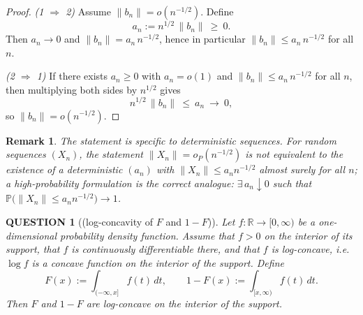 \documentclass[12pt]{article}
\renewcommand{\(}{\left(}%
\renewcommand{\)}{\right)}%
\renewcommand{\[}{\left[}%
\renewcommand{\]}{\right]}%
\newtheorem{question}{QUESTION}[section]}
\newtheorem{remark}{Remark}[section]}
\newtheorem{proof}{Proof.}}
\begin{document}
\begin{proof}
\emph{(1 $\Rightarrow$ 2)} Assume $\|b_n\|=o(n^{-1/2})$. Define
\begin{equation*}
	a_n:=n^{1/2}\,\|b_n\|\ \ge\ 0.
\end{equation*}
Then $a_n\to0$ and $\|b_n\|=a_n\,n^{-1/2}$, hence in particular
$\|b_n\|\le a_n\,n^{-1/2}$ for all $n$.

\smallskip
\noindent
\emph{(2 $\Rightarrow$ 1)} If there exists $a_n\ge0$ with $a_n=o(1)$ and
$\|b_n\|\le a_n\,n^{-1/2}$ for all $n$, then multiplying both sides by $n^{1/2}$
gives
\begin{equation*}
	n^{1/2}\,\|b_n\|\ \le\ a_n\ \longrightarrow\ 0,
\end{equation*}
so $\|b_n\|=o(n^{-1/2})$.
\end{proof}

\begin{remark}
The statement is specific to \emph{deterministic} sequences. For random
sequences $(X_n)$, the statement $\|X_n\|=o_P(n^{-1/2})$ is \emph{not}
equivalent to the existence of a deterministic $(a_n)$ with
$\|X_n\|\le a_n n^{-1/2}$ almost surely for all $n$; a high-probability
formulation is the correct analogue:
$\exists\,a_n\downarrow0$ such that
$\mathbb P\!\big(\|X_n\|\le a_n n^{-1/2}\big)\to1$.
\end{remark}

\begin{question}[(log-concavity of $F$ and $1-F$)]
	Let $f:\mathbb{R}\to[0,\infty)$ be a one-dimensional probability density
function. Assume that $f>0$ on the interior of its support, that $f$ is
continuously differentiable there, and that $f$ is log-concave, i.e.
$\log f$ is a concave function on the interior of the support.  Define
\begin{equation*}
F(x) := \int_{(-\infty,x]} f(t)\,dt,
\qquad
1-F(x) := \int_{[x,\infty)} f(t)\,dt .
\end{equation*}
Then $F$ and $1-F$ are log-concave on the interior of the support.
\end{question}
\end{document}
